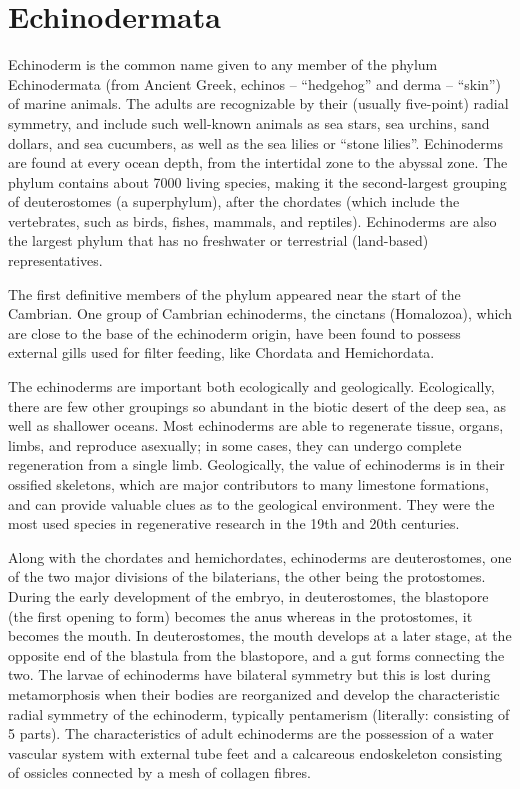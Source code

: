 \documentclass[]{book}
\begin{document}
\hypertarget{echinodermata}{%
\section{Echinodermata}\label{echinodermata}}

Echinoderm is the common name given to any member of the phylum Echinodermata (from Ancient Greek, echinos -- ``hedgehog'' and derma -- ``skin'') of marine animals. The adults are recognizable by their (usually five-point) radial symmetry, and include such well-known animals as sea stars, sea urchins, sand dollars, and sea cucumbers, as well as the sea lilies or ``stone lilies''. Echinoderms are found at every ocean depth, from the intertidal zone to the abyssal zone. The phylum contains about 7000 living species, making it the second-largest grouping of deuterostomes (a superphylum), after the chordates (which include the vertebrates, such as birds, fishes, mammals, and reptiles). Echinoderms are also the largest phylum that has no freshwater or terrestrial (land-based) representatives.

The first definitive members of the phylum appeared near the start of the Cambrian. One group of Cambrian echinoderms, the cinctans (Homalozoa), which are close to the base of the echinoderm origin, have been found to possess external gills used for filter feeding, like Chordata and Hemichordata.

The echinoderms are important both ecologically and geologically. Ecologically, there are few other groupings so abundant in the biotic desert of the deep sea, as well as shallower oceans. Most echinoderms are able to regenerate tissue, organs, limbs, and reproduce asexually; in some cases, they can undergo complete regeneration from a single limb. Geologically, the value of echinoderms is in their ossified skeletons, which are major contributors to many limestone formations, and can provide valuable clues as to the geological environment. They were the most used species in regenerative research in the 19th and 20th centuries.

Along with the chordates and hemichordates, echinoderms are deuterostomes, one of the two major divisions of the bilaterians, the other being the protostomes. During the early development of the embryo, in deuterostomes, the blastopore (the first opening to form) becomes the anus whereas in the protostomes, it becomes the mouth. In deuterostomes, the mouth develops at a later stage, at the opposite end of the blastula from the blastopore, and a gut forms connecting the two. The larvae of echinoderms have bilateral symmetry but this is lost during metamorphosis when their bodies are reorganized and develop the characteristic radial symmetry of the echinoderm, typically pentamerism (literally: consisting of 5 parts). The characteristics of adult echinoderms are the possession of a water vascular system with external tube feet and a calcareous endoskeleton consisting of ossicles connected by a mesh of collagen fibres.
\end{document}
